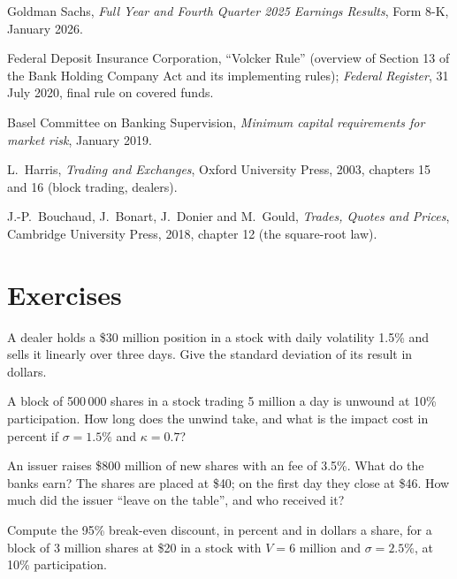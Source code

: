 \begin{omsources}
\item Goldman Sachs, \emph{Full Year and Fourth Quarter 2025 Earnings
Results}, Form 8-K, January 2026.
\item Federal Deposit Insurance Corporation, ``Volcker Rule'' (overview of
Section 13 of the Bank Holding Company Act and its implementing rules);
\emph{Federal Register}, 31 July 2020, final rule on covered funds.
\item Basel Committee on Banking Supervision, \emph{Minimum capital
requirements for market risk}, January 2019.
\item L.~Harris, \emph{Trading and Exchanges}, Oxford University Press, 2003,
chapters 15 and 16 (block trading, dealers).
\item J.-P.~Bouchaud, J.~Bonart, J.~Donier and M.~Gould, \emph{Trades, Quotes
and Prices}, Cambridge University Press, 2018, chapter 12 (the square-root
law).
\end{omsources}

\section{Exercises}

\begin{exercise}[$\star$]\label{exo:m1:the-sell-side:1}
A dealer holds a \$30 million position in a stock with daily volatility
1.5\% and sells it linearly over three days. Give the standard deviation of
its result in dollars.
\end{exercise}

\begin{exercise}[$\star$]\label{exo:m1:the-sell-side:2}
A block of 500\,000 shares in a stock trading 5 million a day is unwound at
10\% participation. How long does the unwind take, and what is the impact
cost in percent if $\sigma = 1.5\%$ and $\kappa = 0.7$?
\end{exercise}

\begin{exercise}[$\star$]\label{exo:m1:the-sell-side:3}
An issuer raises \$800 million of new shares with an  fee of
3.5\%. What do the banks earn? The shares are placed at \$40; on the first
day they close at \$46. How much did the issuer ``leave on the table'', and
who received it?
\end{exercise}

\begin{exercise}[$\star\star$]\label{exo:m1:the-sell-side:4}
Compute the 95\% break-even discount, in percent and in dollars a share, for
a block of 3 million shares at \$20 in a stock with $V = 6$ million and
$\sigma = 2.5\%$, at 10\% participation.
\end{exercise}

